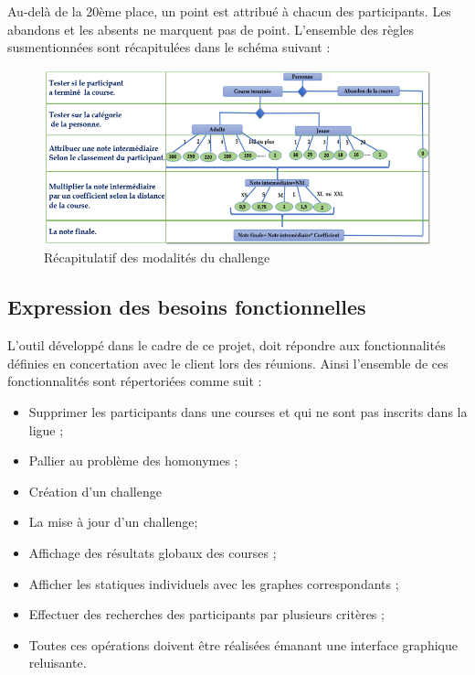 	\newpage
	Au-delà de la 20ème place, un point est attribué à chacun des participants. Les abandons et les absents ne marquent pas de point. 
	L’ensemble des règles susmentionnées sont récapitulées dans le schéma suivant :
	\begin{figure}[!h]
	   \center
	   \includegraphics[scale=0.9]{img/recapitulatif_modalite_challenge.png}
	   \caption {Récapitulatif des modalités du challenge}
	\end{figure}
	
	\newpage
	\subsection{Expression des besoins fonctionnelles}
	L’outil développé dans le cadre de ce projet, doit répondre aux fonctionnalités définies en concertation avec le client lors des réunions. Ainsi l’ensemble de ces fonctionnalités sont répertoriées comme suit :
	\begin{itemize} 
	\item Supprimer les participants dans une courses et qui ne sont pas inscrits dans la ligue ;	
	\item Pallier au problème des homonymes ;
	\item Création d’un challenge
	\item La mise à jour d’un challenge;
	\item Affichage des résultats globaux des courses ;
	\item Afficher les statiques individuels avec les graphes correspondants ;
	\item Effectuer des recherches des participants par plusieurs critères ;
	\item Toutes ces opérations doivent être réalisées émanant une interface graphique reluisante.
	\end{itemize} 
	

